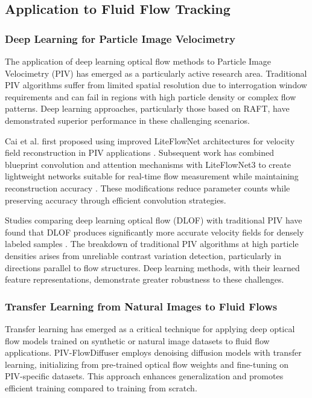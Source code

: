 \subsection{Application to Fluid Flow Tracking}

\subsubsection{Deep Learning for Particle Image Velocimetry}

The application of deep learning optical flow methods to Particle Image Velocimetry (PIV) has emerged as a particularly active research area. Traditional PIV algorithms suffer from limited spatial resolution due to interrogation window requirements and can fail in regions with high particle density or complex flow patterns. Deep learning approaches, particularly those based on RAFT, have demonstrated superior performance in these challenging scenarios.

Cai et al. first proposed using improved LiteFlowNet architectures for velocity field reconstruction in PIV applications \cite{cai2019pivliteflownet}. Subsequent work has combined blueprint convolution and attention mechanisms with LiteFlowNet3 to create lightweight networks suitable for real-time flow measurement while maintaining reconstruction accuracy \cite{zhang2024lightweight}. These modifications reduce parameter counts while preserving accuracy through efficient convolution strategies.

Studies comparing deep learning optical flow (DLOF) with traditional PIV have found that DLOF produces significantly more accurate velocity fields for densely labeled samples \cite{zhang2024dlof}. The breakdown of traditional PIV algorithms at high particle densities arises from unreliable contrast variation detection, particularly in directions parallel to flow structures. Deep learning methods, with their learned feature representations, demonstrate greater robustness to these challenges.

\subsubsection{Transfer Learning from Natural Images to Fluid Flows}

Transfer learning has emerged as a critical technique for applying deep optical flow models trained on synthetic or natural image datasets to fluid flow applications. PIV-FlowDiffuser \cite{xu2024pivflowdiffuser} employs denoising diffusion models with transfer learning, initializing from pre-trained optical flow weights and fine-tuning on PIV-specific datasets. This approach enhances generalization and promotes efficient training compared to training from scratch.

